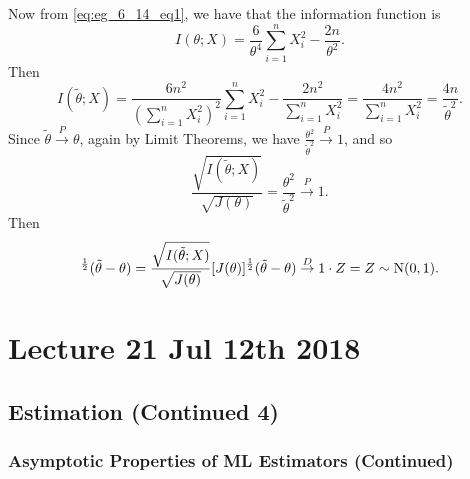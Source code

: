\documentclass[notoc,notitlepage]{tufte-book}
\newcommand{\convd}{\overset{D}{\to}}
\newcommand{\convp}{\overset{P}{\to}}
\begin{document}
\begin{solution}
  Now from \cref{eq:eg_6_14_eq1}, we have that the information function is
  \begin{equation*}
    I(\theta; X) = \frac{6}{\theta^4} \sum_{i=1}^{n} X_i^2 - \frac{2n}{\theta^2}.
  \end{equation*}
  Then
  \begin{equation*}
    I(\tilde{\theta}; X) = \frac{6n^2}{\left( \sum\limits_{i=1}^{n} X_i^2 \right)^2} \sum_{i=1}^{n} X_i^2 - \frac{2n^2}{ \sum\limits_{i=1}^{n} X_i^2 } = \frac{4n^2}{\sum_{i=1}^{n} X_i^2} = \frac{4n}{\tilde{\theta}^2}.
  \end{equation*}
  Since $\tilde{\theta} \convp \theta$, again by Limit Theorems, we have $\frac{\theta^2}{\tilde{\theta}^2} \convp 1$, and so
  \begin{equation*}
    \frac{\sqrt{I(\tilde{\theta}; X)}}{\sqrt{J(\theta)}} = \frac{\theta^2}{\tilde{\theta}^2} \convp 1.
  \end{equation*}
  Then
  \begin{equation*}
    [I(\tilde{\theta}; X)]^{\frac{1}{2}} ( \tilde{\theta} - \theta ) = \frac{\sqrt{I(\tilde{\theta}; X)}}{\sqrt{J(\theta)}} [ J(\theta) ]^{\frac{1}{2}} (\tilde{\theta} - \theta) \convd 1 \cdot Z = Z \sim \Nor(0, 1).
  \end{equation*}
\end{solution}




\chapter{Lecture 21 Jul 12th 2018}%
\label{chp:lecture_21_jul_12th_2018}

\section{Estimation (Continued 4)}%
\label{sec:estimation_continued_4}

\subsection{Asymptotic Properties of ML Estimators (Continued)}%
\label{sub:asymptotic_properties_of_ml_estimators_continued}
\end{document}
